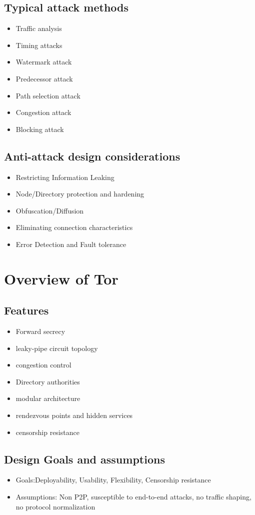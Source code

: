 \documentclass{llncs}
\begin{document}
\subsection{Typical attack methods}
\begin{itemize}
	\item{Traffic analysis}
	\item{Timing attacks}
	\item{Watermark attack}
	\item{Predecessor attack}
	\item{Path selection attack}
	\item{Congestion attack}
	\item{Blocking attack}
\end{itemize}
\subsection{Anti-attack design considerations}
\begin{itemize}
	\item{Restricting Information Leaking}
	\item{Node/Directory protection and hardening}
	\item{Obfuscation/Diffusion}
	\item{Eliminating connection characteristics}
	\item{Error Detection and Fault tolerance}
\end{itemize}

\section{Overview of Tor} \label{tor}
\subsection{Features}
\begin{itemize}
	\item{Forward secrecy}
	\item{leaky-pipe circuit topology}
	\item{congestion control}
	\item{Directory authorities}
	\item{modular architecture}
	\item{rendezvous points and hidden services}
	\item{censorship resistance}
\end{itemize}
\subsection{Design Goals and assumptions}
\begin{itemize}
	\item{Goals:Deployability, Usability, Flexibility, Censorship resistance}
	\item{Assumptions: Non P2P, susceptible to end-to-end attacks, no traffic shaping, no protocol normalization}
\end{itemize}
\end{document}
